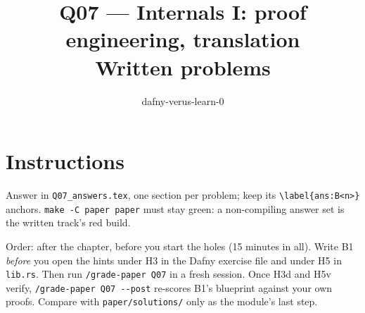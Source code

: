 \documentclass[11pt]{article}
\title{Q07 --- Internals I: proof engineering, translation \\ \large Written problems}
\author{dafny-verus-learn-0}
\date{}
\begin{document}
\maketitle

\section*{Instructions}
Answer in \texttt{Q07\_answers.tex}, one section per problem; keep its
\verb+\label{ans:B<n>}+ anchors. \texttt{make -C paper paper} must stay green:
a non-compiling answer set is the written track's red build.

Order: after the chapter, before you start the holes (15 minutes in all). Write
B1 \emph{before} you open the hints under H3 in the Dafny exercise file and
under H5 in \texttt{lib.rs}. Then run \texttt{/grade-paper Q07} in a fresh
session. Once H3d and H5v verify, \verb+/grade-paper Q07 --post+ re-scores B1's
blueprint against your own proofs. Compare with \texttt{paper/solutions/} only
as the module's last step.
\end{document}
